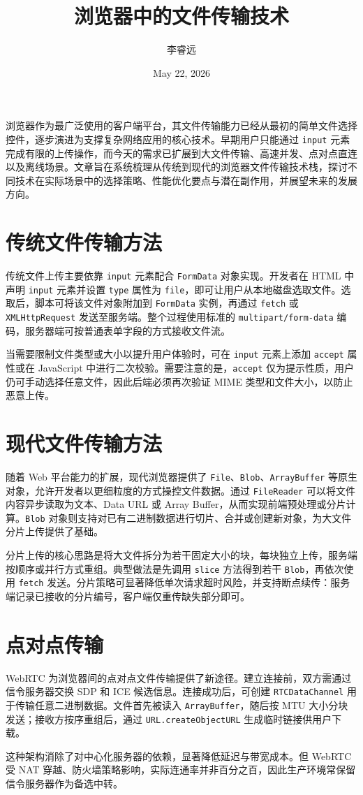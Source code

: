 \title{浏览器中的文件传输技术}
\author{李睿远}
\date{May 22, 2026}
\maketitle
浏览器作为最广泛使用的客户端平台，其文件传输能力已经从最初的简单文件选择控件，逐步演进为支撑复杂网络应用的核心技术。早期用户只能通过 \texttt{input} 元素完成有限的上传操作，而今天的需求已扩展到大文件传输、高速并发、点对点直连以及离线场景。文章旨在系统梳理从传统到现代的浏览器文件传输技术栈，探讨不同技术在实际场景中的选择策略、性能优化要点与潜在副作用，并展望未来的发展方向。\par
\chapter{传统文件传输方法}
传统文件上传主要依靠 \texttt{input} 元素配合 \texttt{FormData} 对象实现。开发者在 HTML 中声明 \texttt{input} 元素并设置 \texttt{type} 属性为 \texttt{file}，即可让用户从本地磁盘选取文件。选取后，脚本可将该文件对象附加到 \texttt{FormData} 实例，再通过 \texttt{fetch} 或 \texttt{XMLHttpRequest} 发送至服务端。整个过程使用标准的 \texttt{multipart/form-data} 编码，服务器端可按普通表单字段的方式接收文件流。\par
当需要限制文件类型或大小以提升用户体验时，可在 \texttt{input} 元素上添加 \texttt{accept} 属性或在 JavaScript 中进行二次校验。需要注意的是，\texttt{accept} 仅为提示性质，用户仍可手动选择任意文件，因此后端必须再次验证 MIME 类型和文件大小，以防止恶意上传。\par
\chapter{现代文件传输方法}
随着 Web 平台能力的扩展，现代浏览器提供了 \texttt{File}、\texttt{Blob}、\texttt{ArrayBuffer} 等原生对象，允许开发者以更细粒度的方式操控文件数据。通过 \texttt{FileReader} 可以将文件内容异步读取为文本、Data URL 或 Array Buffer，从而实现前端预处理或分片计算。\texttt{Blob} 对象则支持对已有二进制数据进行切片、合并或创建新对象，为大文件分片上传提供了基础。\par
分片上传的核心思路是将大文件拆分为若干固定大小的块，每块独立上传，服务端按顺序或并行方式重组。典型做法是先调用 \texttt{slice} 方法得到若干 \texttt{Blob}，再依次使用 \texttt{fetch} 发送。分片策略可显著降低单次请求超时风险，并支持断点续传：服务端记录已接收的分片编号，客户端仅重传缺失部分即可。\par
\chapter{点对点传输}
WebRTC 为浏览器间的点对点文件传输提供了新途径。建立连接前，双方需通过信令服务器交换 SDP 和 ICE 候选信息。连接成功后，可创建 \texttt{RTCDataChannel} 用于传输任意二进制数据。文件首先被读入 \texttt{ArrayBuffer}，随后按 MTU 大小分块发送；接收方按序重组后，通过 \texttt{URL.createObjectURL} 生成临时链接供用户下载。\par
这种架构消除了对中心化服务器的依赖，显著降低延迟与带宽成本。但 WebRTC 受 NAT 穿越、防火墙策略影响，实际连通率并非百分之百，因此生产环境常保留信令服务器作为备选中转。\par
